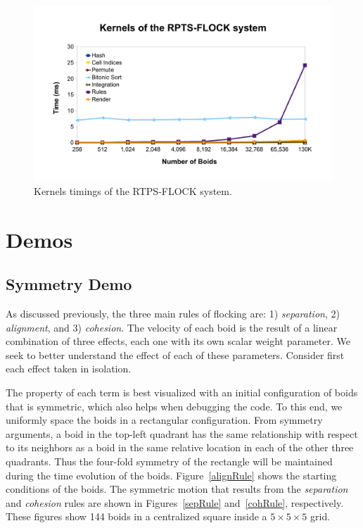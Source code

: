 \begin{figure}[htbp]
\begin{center}
\includegraphics[scale=0.7]{figures/kernelsPlot.pdf}
\caption{Kernels timings of the RTPS-FLOCK system.}
\label{kernelBench}
\end{center}
\end{figure}


\section{Demos}

\subsection{Symmetry Demo}
As discussed previously, the three main rules of flocking are: 1) \textit{separation}, 2) \textit{alignment}, and 3) \textit{cohesion}. The velocity of each boid is the result of a linear combination of three effects, each one with its own scalar weight parameter. We seek to better understand the effect of each of these parameters. Consider first each effect taken in isolation.

The property of each term is best visualized with an initial configuration of boids that is symmetric, which also helps when debugging the code. To this end, we uniformly space the boids in a rectangular configuration.  From symmetry arguments, a boid in the top-left quadrant has the same relationship with respect to its neighbors as a boid in the same relative location in each of the other three quadrants. Thus the four-fold symmetry of the rectangle will be maintained during the time evolution of the boids. Figure~\ref{alignRule} shows the starting conditions of the boids. The symmetric motion that results from the \textit{separation} and \textit{cohesion} rules are shown in Figures~\ref{sepRule} and~\ref{cohRule}, respectively. These figures show 144 boids in a centralized square inside a $5\times 5\times 5$ grid.

